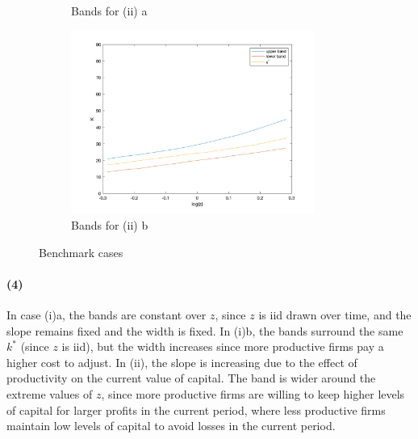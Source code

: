 \documentclass[10pt,letter]{article}
\newcommand{\problempart}[1]{\paragraph{#1}}
\begin{document}
\begin{center}
\begin{figure}
\begin{subfigure}{.5\textwidth}
\caption{Bands for (ii) a}
\end{subfigure}
\begin{subfigure}{.5\textwidth}
\includegraphics[width=8cm]{ps3q2_fig4}
\caption{Bands for (ii) b}
\end{subfigure}
\caption{Benchmark cases}
\end{figure}
\end{center}
\problempart{(4)}
In case (i)a, the bands are constant over $z$, since $z$ is iid drawn over time, and the slope remains fixed and the width is fixed. In (i)b, the bands surround the same $k^*$ (since $z$ is iid), but the width increases since more productive firms pay a higher cost to adjust. In (ii), the slope is increasing due to the effect of productivity on the current value of capital. The band is wider around the extreme values of $z$, since more productive firms are willing to keep higher levels of capital for larger profits in the current period, where less productive firms maintain low levels of capital to avoid losses in the current period.
\end{document}
